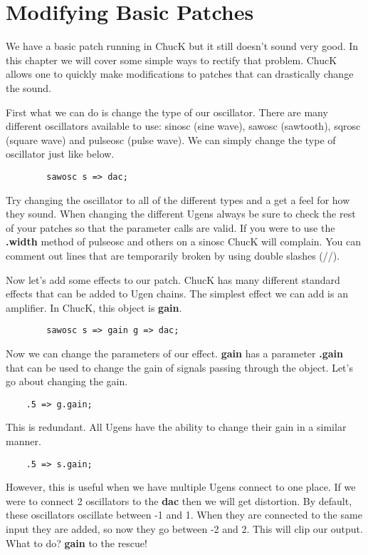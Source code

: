\section{Modifying Basic Patches}

We have a basic patch running in ChucK but it still doesn't sound very good. In this chapter we will cover some simple ways to rectify that problem. ChucK allows one to quickly make modifications to patches that can drastically change the sound.

First what we can do is change the type of our oscillator. There are many different oscillators available to use: sinosc (sine wave), sawosc (sawtooth), sqrosc (square wave) and  pulseosc (pulse wave). We can simply change the type of oscillator just like below. 

\begin{verbatim}
        sawosc s => dac;
\end{verbatim}

Try changing the oscillator to all of the different types and a get a feel for how they sound. When changing the different Ugens always be sure to check the rest of your patches so that the parameter calls are valid. If you were to use the {\bf .width} method of pulseosc and others on a sinosc ChucK will complain. You can comment out lines that are temporarily broken by using double slashes (//).

Now let's add some effects to our patch. ChucK has many different standard effects that can be added to Ugen chains. The simplest effect we can add is an amplifier. In ChucK, this object is {\bf gain}.

\begin{verbatim}
        sawosc s => gain g => dac;
\end{verbatim}

Now we can change the parameters of our effect. {\bf gain} has a parameter {\bf .gain} that can be used to change the gain  of signals passing through the object. Let's go about changing the gain.

\begin{verbatim}
	.5 => g.gain;
\end{verbatim}

This is redundant. All Ugens have the ability to change their gain in a similar manner. 

\begin{verbatim}
	.5 => s.gain;
\end{verbatim}

However, this is useful when we have multiple Ugens connect to one place. If we were to connect 2 oscillators to the {\bf dac} then we will get distortion. By default, these oscillators oscillate between -1 and 1. When they are connected to the same input they are added, so now they go between -2 and 2. This will clip our output. What to do? {\bf gain} to the rescue!

